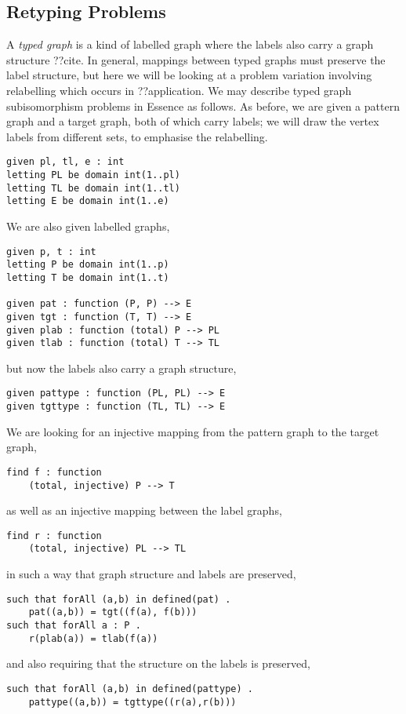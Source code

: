 \documentclass[runningheads]{llncs}
\begin{document}
\subsection{Retyping Problems}\label{section:typegraphs}

A \emph{typed graph} is a kind of labelled graph where the labels also carry a graph structure
??cite. In general, mappings between typed graphs must preserve the label structure, but here we
will be looking at a problem variation involving relabelling which occurs in ??application. We may
describe typed graph subisomorphism problems in Essence as follows. As before, we are given a
pattern graph and a target graph, both of which carry labels; we will draw the vertex labels from
different sets, to emphasise
the relabelling.
\begin{lstlisting}
given pl, tl, e : int
letting PL be domain int(1..pl)
letting TL be domain int(1..tl)
letting E be domain int(1..e)
\end{lstlisting}
We are also given labelled graphs,
\begin{lstlisting}
given p, t : int
letting P be domain int(1..p)
letting T be domain int(1..t)

given pat : function (P, P) --> E
given tgt : function (T, T) --> E
given plab : function (total) P --> PL
given tlab : function (total) T --> TL
\end{lstlisting}
but now the labels also carry a graph structure,
\begin{lstlisting}
given pattype : function (PL, PL) --> E
given tgttype : function (TL, TL) --> E
\end{lstlisting}
We are looking for an injective mapping from the pattern graph to the target graph,
\begin{lstlisting}
find f : function
    (total, injective) P --> T
\end{lstlisting}
as well as an injective mapping between the label graphs,
\begin{lstlisting}
find r : function
    (total, injective) PL --> TL
\end{lstlisting}
in such a way that graph structure and labels are preserved,
\begin{lstlisting}
such that forAll (a,b) in defined(pat) .
    pat((a,b)) = tgt((f(a), f(b)))
such that forAll a : P .
    r(plab(a)) = tlab(f(a))
\end{lstlisting}
and also requiring that the structure on the labels is preserved,
\begin{lstlisting}
such that forAll (a,b) in defined(pattype) .
    pattype((a,b)) = tgttype((r(a),r(b)))
\end{lstlisting}
\end{document}
